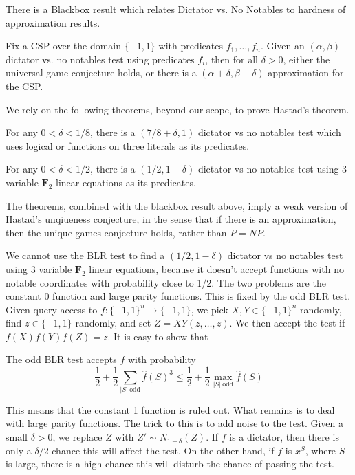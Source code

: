There is a Blackbox result which relates Dictator vs. No Notables to hardness of approximation results.

\begin{theorem}
    Fix a CSP over the domain $\{ -1, 1 \}$ with predicates $f_1, \dots, f_n$. Given an $(\alpha, \beta)$ dictator vs. no notables test using predicates $f_i$, then for all $\delta > 0$, either the universal game conjecture holds, or there is a $(\alpha + \delta, \beta - \delta)$ approximation for the CSP.
\end{theorem}

We rely on the following theorems, beyond our scope, to prove Hastad's theorem.

\begin{theorem}
    For any $0 < \delta < 1/8$, there is a $(7/8 + \delta,1)$ dictator vs no notables test which uses logical or functions on three literals as its predicates.
\end{theorem}

\begin{theorem}
    For any $0 < \delta < 1/2$, there is a $(1/2, 1 - \delta)$ dictator vs no notables test using 3 variable $\mathbf{F}_2$ linear equations as its predicates.
\end{theorem}

The theorems, combined with the blackbox result above, imply a weak version of Hastad's unqiueness conjecture, in the sense that if there is an approximation, then the unique games conjecture holds, rather than $P = NP$.

We cannot use the BLR test to find a $(1/2, 1 - \delta)$ dictator vs no notables test using 3 variable $\mathbf{F}_2$ linear equations, because  it doesn't accept functions with no notable coordinates with probability close to 1/2. The two problems are the constant 0 function and large parity functions. This is fixed by the odd BLR test. Given query access to $f: \{ -1, 1 \}^n \to \{ -1, 1 \}$, we pick $X,Y \in \{ -1, 1 \}^n$ randomly, find $z \in \{ -1, 1 \}$ randomly, and set $Z = XY(z,\dots,z)$. We then accept the test if $f(X) f(Y) f(Z) = z$. It is easy to show that

\begin{theorem}
    The odd BLR test accepts $f$ with probability
    \[ \frac{1}{2} + \frac{1}{2} \sum_{|S|\ \text{odd}} \widehat{f}(S)^3 \leq \frac{1}{2} + \frac{1}{2} \max_{|S|\ \text{odd}} \widehat{f}(S) \]
\end{theorem}
%
This means that the constant 1 function is ruled out. What remains is to deal with large parity functions. The trick to this is to add noise to the test. Given a small $\delta > 0$, we replace $Z$ with $Z' \sim N_{1 - \delta}(Z)$. If $f$ is a dictator, then there is only a $\delta/2$ chance this will affect the test. On the other hand, if $f$ is $x^S$, where $S$ is large, there is a high chance this will disturb the chance of passing the test.

